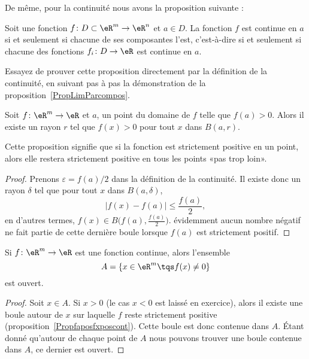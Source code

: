 De même, pour la continuité nous avons la proposition suivante :
\begin{proposition}
	Soit une fonction \( f\colon D\subset\eR^m\to \eR^n\) et \( a\in D\). La fonction \( f\) est continue en \( a\) si et seulement si chacune de ses composantes l'est, c'est-à-dire si et seulement si chacune des fonctions \( f_i\colon D\to \eR\) est continue en \( a\).
\end{proposition}
Essayez de prouver cette proposition directement par la définition de la continuité, en suivant pas à pas la démonstration de la proposition~\ref{PropLimParcompos}.

\begin{proposition}		\label{Propfaposfxposcont}
	Soit \( f\colon \eR^m\to \eR\) et \( a\), un point du domaine de \( f\) telle que \( f(a)>0\). Alors il existe un rayon \( r\) tel que \( f(x)>0\) pour tout \( x\) dans \( B(a,r)\).
\end{proposition}
Cette proposition signifie que si la fonction est strictement positive en un point, alors elle restera strictement positive en tous les points «pas trop loin».

\begin{proof}
	Prenons \( \varepsilon=f(a)/2\) dans la définition de la continuité. Il existe donc un rayon \( \delta\) tel que pour tout \( x\) dans \( B(a,\delta)\),
	\begin{equation}
		| f(x)-f(a) |\leq \frac{ f(a) }{2},
	\end{equation}
	en d'autres termes, \( f(x)\in B\big( f(a),\frac{ f(a) }{ 2 } \big)\). évidemment aucun nombre négatif ne fait partie de cette dernière boule lorsque \( f(a)\) est strictement positif.
\end{proof}

\begin{corollary}		\label{CorfneqzOuvert}
	Si \( f\colon \eR^m\to \eR\) est une fonction continue, alors l'ensemble
	\begin{equation}
		A=\{ x\in\eR^m\tqs f(x)\neq 0 \}
	\end{equation}
	est ouvert.
\end{corollary}

\begin{proof}
	Soit \( x\in A\). Si \( x>0\) (le cas \( x<0\) est laissé en exercice), alors il existe une boule autour de \( x\) sur laquelle \( f\) reste strictement positive (proposition~\ref{Propfaposfxposcont}). Cette boule est donc contenue dans \( A\). Étant donné qu'autour de chaque point de \( A\) nous pouvons trouver une boule contenue dans \( A\), ce dernier est ouvert.
\end{proof}

